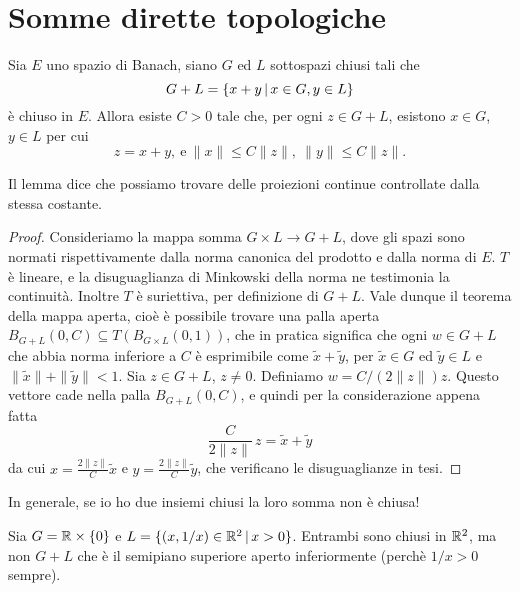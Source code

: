 \section{Somme dirette topologiche}
\begin{lemma}
	Sia $E$ uno spazio di Banach, siano $G$ ed $L$ sottospazi chiusi tali che
	\begin{equation*}
		G+L = \{ x + y \,|\, x \in G, y \in L\}
	\end{equation*}
	è chiuso in $E$.
	Allora esiste $C > 0$ tale che, per ogni $z \in G+L$, esistono $x \in G$, $y \in L$ per cui
	\begin{equation*}
		z = x+y, \ \text{e}\ \|x\| \leq C\|z\|, \ \|y\| \leq C\|z\|.
	\end{equation*}
\end{lemma}
\begin{remark}
	Il lemma dice che possiamo trovare delle proiezioni continue controllate dalla stessa costante.
\end{remark}
\begin{proof}
	Consideriamo la mappa somma $G \times L \to G+L$, dove gli spazi sono normati rispettivamente dalla norma canonica del prodotto e dalla norma di $E$.
	$T$ è lineare, e la disuguaglianza di Minkowski della norma ne testimonia la continuità. Inoltre $T$ è suriettiva, per definizione di $G+L$.
	Vale dunque il teorema della mappa aperta, cioè è possibile trovare una palla aperta $B_{G+L}(0, C) \subseteq T(B_{G \times L}(0, 1))$, che in pratica significa che ogni $w \in G+L$ che abbia norma inferiore a $C$ è esprimibile come $\tilde x + \tilde y$, per $\tilde x \in G$ ed $\tilde y \in L$ e $\|\tilde x\|+\|\tilde y\|<1$.
	Sia $z \in G+L$, $z \neq 0$. Definiamo $w=C/(2\|z\|) z$. Questo vettore cade nella palla $B_{G+L}(0, C)$, e quindi per la considerazione appena fatta
	\begin{equation*}
		\frac{C}{2 \|z\|}\, z = \tilde x + \tilde y
	\end{equation*}
	da cui $x = \frac{2\|z\|}C \tilde x$ e $y= \frac{2\|z\|}C \tilde y$, che verificano le disuguaglianze in tesi.
\end{proof}

In generale, se io ho due insiemi chiusi la loro somma non è chiusa!

\begin{counterexample}
	Sia $G = \mathbb{R} \times \{0\}$ e $L = \{(x,1/x) \in \mathbb{R}^2 \,|\, x >0\}$. Entrambi sono chiusi in $\mathbb{R}^2$, ma non $G+L$ che è il semipiano superiore aperto inferiormente (perchè $1/x > 0$ sempre).
\end{counterexample}

